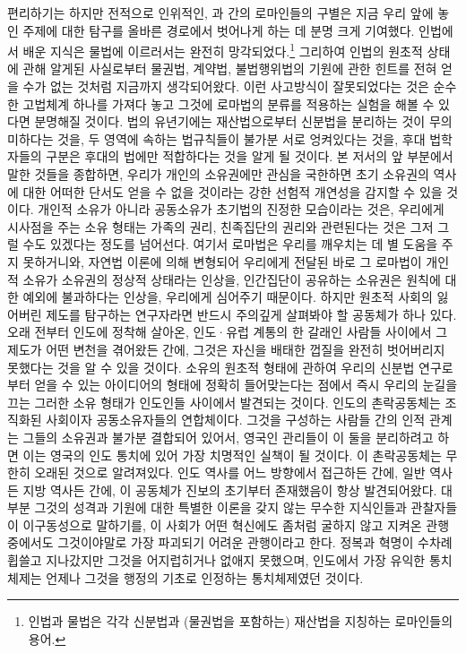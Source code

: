 편리하기는 하지만 전적으로 인위적인,
과  간의
로마인들의 구별은
지금 우리 앞에 놓인 주제에 대한 탐구를 올바른 경로에서
벗어나게 하는 데 분명 크게 기여했다.
인법에서 배운 지식은
물법에 이르러서는 완전히 망각되었다.\footnote{%
  인법과 물법은 각각 신분법과 (물권법을 포함하는) 재산법을 지칭하는
  로마인들의 용어.
  }
그리하여
인법의 원초적 상태에 관해 알게된 사실로부터
물권법, 계약법, 불법행위법의 기원에 관한 힌트를 전혀 얻을 수가 없는 것처럼
지금까지 생각되어왔다.
이런 사고방식이 잘못되었다는 것은
순수한 고법체계 하나를 가져다 놓고
그것에 로마법의 분류를 적용하는 실험을 해볼 수 있다면
분명해질 것이다.
법의 유년기에는
재산법으로부터 신분법을 분리하는 것이 무의미하다는 것을,
두 영역에 속하는 법규칙들이 불가분 서로 엉켜있다는 것을,
후대 법학자들의 구분은 후대의 법에만 적합하다는 것을
알게 될 것이다.
본 저서의 앞 부분에서 말한 것들을 종합하면,
우리가 개인의 소유권에만 관심을 국한하면
초기 소유권의 역사에 대한 어떠한 단서도 얻을 수 없을 것이라는
강한 선험적 개연성을 감지할 수 있을 것이다.
개인적 소유가 아니라 공동소유가 초기법의 진정한 모습이라는 것은,
우리에게 시사점을 주는 소유 형태는 가족의 권리, 친족집단의 권리와
관련된다는 것은 그저 그럴 수도 있겠다는 정도를 넘어선다.
여기서 로마법은 우리를 깨우치는 데 별 도움을 주지 못하거니와,
자연법 이론에 의해 변형되어
우리에게 전달된 바로 그 로마법이
개인적 소유가 소유권의 정상적 상태라는 인상을,
인간집단이 공유하는 소유권은 원칙에 대한 예외에 불과하다는 인상을,
우리에게 심어주기 때문이다.
하지만 원초적 사회의 잃어버린 제도를 탐구하는 연구자라면
반드시 주의깊게 살펴봐야 할 공동체가 하나 있다.
오래 전부터 인도에 정착해 살아온,
인도^^b7유럽 계통의 한 갈래인 사람들 사이에서
그 제도가
어떤 변천을 겪어왔든 간에,
그것은
자신을 배태한 껍질을 완전히 벗어버리지 못했다는 것을 알 수 있을 것이다.
소유의 원초적 형태에 관하여
우리의 신분법 연구로부터
얻을 수 있는
아이디어의
형태에 정확히 들어맞는다는 점에서
즉시
우리의 눈길을 끄는 그러한 소유 형태가
인도인들 사이에서
발견되는 것이다.
인도의 촌락공동체는 조직화된  사회이자
공동소유자들의 연합체이다.
그것을 구성하는 사람들 간의 인적 관계는
그들의 소유권과 불가분 결합되어 있어서,
영국인 관리들이 이 둘을 분리하려고 하면 이는
영국의 인도 통치에 있어 가장 치명적인 실책이 될 것이다.
이 촌락공동체는 무한히 오래된 것으로 알려져있다.
인도 역사를 어느 방향에서 접근하든 간에,
일반 역사든 지방 역사든 간에,
이 공동체가 진보의 초기부터 존재했음이 항상 발견되어왔다.
대부분 그것의 성격과 기원에 대한 특별한 이론을 갖지 않는
무수한 지식인들과 관찰자들이
이구동성으로 말하기를,
이 사회가
어떤 혁신에도 좀처럼 굴하지 않고 지켜온 관행 중에서도
그것이야말로 가장 파괴되기 어려운 관행이라고 한다.
정복과 혁명이 수차례 휩쓸고 지나갔지만
그것을 어지럽히거나 없애지 못했으며,
인도에서 가장 유익한 통치체제는 언제나
그것을 행정의 기초로 인정하는 통치체제였던 것이다.

